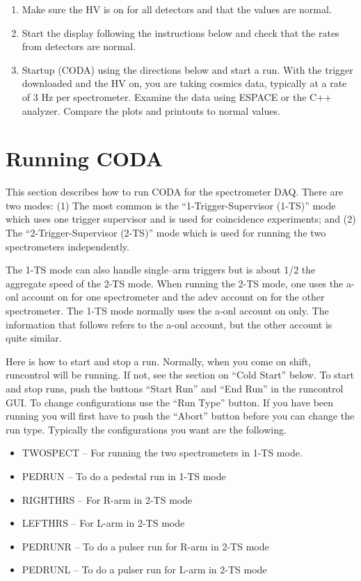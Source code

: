 {\begin{enumerate}
\item{Make sure the HV is on for all detectors
and that the values are normal.}

\item{Start the 
display following the instructions below and
check that the rates from detectors are normal.}
 
\item{Startup  (CODA) using the directions below
and start a run.  With the trigger downloaded
and the HV on, you are taking cosmics data, typically at 
a rate of 3 Hz per spectrometer.  
Examine the data using ESPACE or the C++ analyzer.
Compare the plots and printouts to normal values.}

\end{enumerate}

\section{Running CODA}

\par
This section describes how to run CODA for
the spectrometer DAQ.  There are two modes:
(1) The most common is the ``1-Trigger-Supervisor (1-TS)''
mode which uses one trigger supervisor and
is used for coincidence experiments; and
(2) The ``2-Trigger-Supervisor (2-TS)'' mode which
is used for running the two spectrometers
independently.

\par
The 1-TS mode can also handle single--arm
triggers but is about 1/2 the aggregate speed
of the 2-TS mode.  When running the 2-TS
mode, one uses the a-onl account on  for one
spectrometer and the adev account on  
for the other spectrometer.  
The 1-TS mode normally uses the 
a-onl account on  only.
The information that follows refers to 
the a-onl account, but the other account is quite similar.

\par
Here is how to start and stop a run.
Normally, when you come on shift, 
runcontrol will be running.  If not,
see the section on ``Cold Start'' below.
To start and stop runs, push the buttons
``Start Run'' and ``End Run'' in the
runcontrol GUI.   To change configurations
use the ``Run Type'' button.  If you have
been running you will first have to push the
``Abort'' button before you can change the 
run type. Typically the configurations
you want are the following.

\begin{itemize} 
\item[~]TWOSPECT -- For running the two spectrometers in
1-TS mode.
\item[~]PEDRUN -- To do a pedestal run in 1-TS mode
\item[~]RIGHTHRS -- For R-arm in 2-TS mode
\item[~]LEFTHRS -- For L-arm in 2-TS mode
\item[~]PEDRUNR -- To do a pulser run for R-arm in 2-TS mode
\item[~]PEDRUNL -- To do a pulser run for L-arm in 2-TS mode
\end{itemize} 

}
